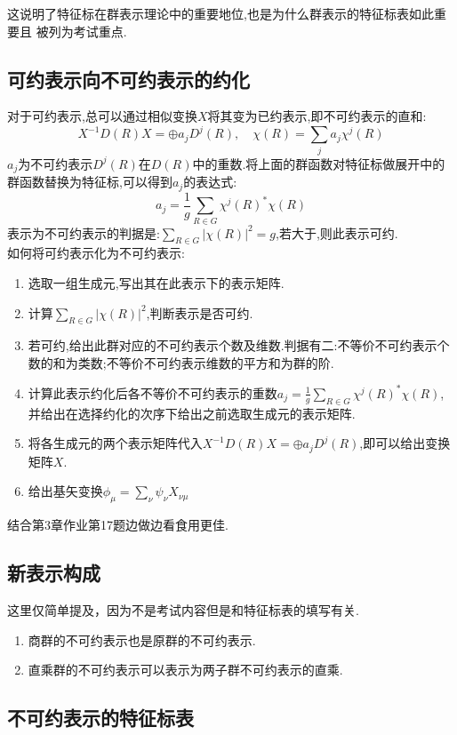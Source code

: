 \documentclass{ctexart}
\begin{document}
这说明了特征标在群表示理论中的重要地位,也是为什么群表示的特征标表如此重要且
被列为考试重点.

\subsection{可约表示向不可约表示的约化}

对于可约表示,总可以通过相似变换$X$将其变为已约表示,即不可约表示的直和:
\[
X^{-1}D(R)X=\oplus a_{j}D^{j}(R), \quad \chi(R)=\sum_{j}a_{j}\chi^{j}(R)
\]
$a_{j}$为不可约表示$D^{j}(R)$在$D(R)$中的重数.将上面的群函数对特征标做展开中的群函数替换为特征标,可以得到$a_{j}$的表达式:
\[
a_{j}=\frac{1}{g}\sum_{R\in G} \chi^{j}(R)^{*}\chi(R)
\]
表示为不可约表示的判据是:$\sum_{R\in G}\left|\chi(R)\right|^{2}=g$,若大于,则此表示可约.\\

如何将可约表示化为不可约表示:
\begin{enumerate}
    \item 选取一组生成元,写出其在此表示下的表示矩阵.
    \item 计算$\sum_{R\in G}\left|\chi(R)\right|^{2}$,判断表示是否可约.
    \item 若可约,给出此群对应的不可约表示个数及维数.判据有二:不等价不可约表示个数的和为类数;不等价不可约表示维数的平方和为群的阶.
    \item 计算此表示约化后各不等价不可约表示的重数$a_{j}=\frac{1}{g}\sum_{R\in G} \chi^{j}(R)^{*}\chi(R)$,并给出在选择约化的次序下给出之前选取生成元的表示矩阵.
    \item 将各生成元的两个表示矩阵代入$X^{-1}D(R)X=\oplus a_{j}D^{j}(R)$,即可以给出变换矩阵$X$.
    \item 给出基矢变换$\phi_{\mu}=\sum_{\nu}\psi_{\nu}X_{\nu\mu}$
\end{enumerate}

结合第3章作业第17题边做边看食用更佳.

\subsection{新表示构成}
这里仅简单提及，因为不是考试内容但是和特征标表的填写有关.

\begin{enumerate}
    \item 商群的不可约表示也是原群的不可约表示.
    \item 直乘群的不可约表示可以表示为两子群不可约表示的直乘.
\end{enumerate}

\subsection{不可约表示的特征标表}
\end{document}
